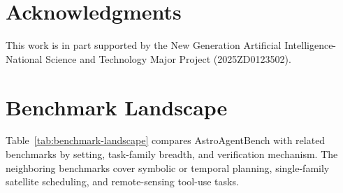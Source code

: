 \documentclass[]{mosi}
\begin{document}
\section*{Acknowledgments}

This work is in part supported by the New Generation Artificial Intelligence-National Science and Technology Major Project (2025ZD0123502).




\clearpage
\beginappendix
\raggedbottom

\section{Benchmark Landscape}
\label{app:benchmark-landscape}

Table~\ref{tab:benchmark-landscape} compares AstroAgentBench with related benchmarks by setting, task-family breadth, and verification mechanism. The neighboring benchmarks cover symbolic or temporal planning, single-family satellite scheduling, and remote-sensing tool-use tasks.
\end{document}

